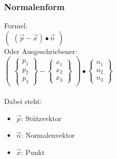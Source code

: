 
\subsubsection{Normalenform}
Formel: \\
$
\begin{pmatrix}
    (\vec{p} - \vec{x}) \bullet \vec{n}
\end{pmatrix}
$ 
\\
Oder Ausgeschriebener: \\
$
\begin{pmatrix}
    \begin{Bmatrix}
        p_1 \\ p_2 \\ p_3
    \end{Bmatrix} 
    - 
    \begin{Bmatrix}
        x_1 \\ x_2 \\ x_3
    \end{Bmatrix}
\end{pmatrix}
\bullet 
\begin{Bmatrix}
    n_1 \\ n_2 \\ n_3
\end{Bmatrix}
$
\\\\
Dabei steht: 
\begin{itemize}
    \item $\vec{p}$: Stützvektor
    \item $\vec{n}$: Normalenvektor
    \item $\vec{x}$: Punkt
\end{itemize}


